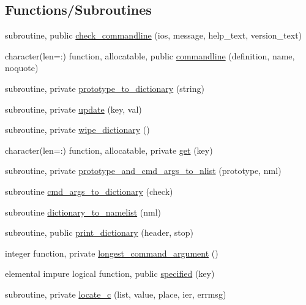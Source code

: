 \subsection*{Functions/\+Subroutines}
\begin{DoxyCompactItemize}
\item 
subroutine, public \mbox{\hyperlink{namespacem__cli_a62056f0c153eb63cb0b11a21edb028cd}{check\+\_\+commandline}} (ios, message, help\+\_\+text, version\+\_\+text)
\item 
character(len=\+:) function, allocatable, public \mbox{\hyperlink{namespacem__cli_a4f639b0c4bf16930fc1c5858ed4196a3}{commandline}} (definition, name, noquote)
\item 
subroutine, private \mbox{\hyperlink{namespacem__cli_a8c62537a2d224364c9cb30005be819e9}{prototype\+\_\+to\+\_\+dictionary}} (string)
\item 
subroutine, private \mbox{\hyperlink{namespacem__cli_a9b7676d796e5cb878ecd9294b8a689cb}{update}} (key, val)
\item 
subroutine, private \mbox{\hyperlink{namespacem__cli_a3c1b30406fc692841826be979726bb1b}{wipe\+\_\+dictionary}} ()
\item 
character(len=\+:) function, allocatable, private \mbox{\hyperlink{namespacem__cli_a45783c194a1484042f63c58b180ca8df}{get}} (key)
\item 
subroutine, private \mbox{\hyperlink{namespacem__cli_ac77d70573b34ade2079cc4004a6acba5}{prototype\+\_\+and\+\_\+cmd\+\_\+args\+\_\+to\+\_\+nlist}} (prototype, nml)
\item 
subroutine \mbox{\hyperlink{namespacem__cli_a89a63254465b02048f09541e51974764}{cmd\+\_\+args\+\_\+to\+\_\+dictionary}} (check)
\item 
subroutine \mbox{\hyperlink{namespacem__cli_a7e5041efcad56387232475a3ae728634}{dictionary\+\_\+to\+\_\+namelist}} (nml)
\item 
subroutine, public \mbox{\hyperlink{namespacem__cli_a5b6abaf1d5aec5e918be0759df29c849}{print\+\_\+dictionary}} (header, stop)
\item 
integer function, private \mbox{\hyperlink{namespacem__cli_aaf5504d3b48696a9d22fa5773c5a7d15}{longest\+\_\+command\+\_\+argument}} ()
\item 
elemental impure logical function, public \mbox{\hyperlink{namespacem__cli_a3822e3acc1d6ae296f9f27a83cc1ca23}{specified}} (key)
\item 
subroutine, private \mbox{\hyperlink{namespacem__cli_ade3d1e36f0fc6a47b5469dcd8ade5312}{locate\+\_\+c}} (list, value, place, ier, errmsg)

\end{DoxyCompactItemize}
